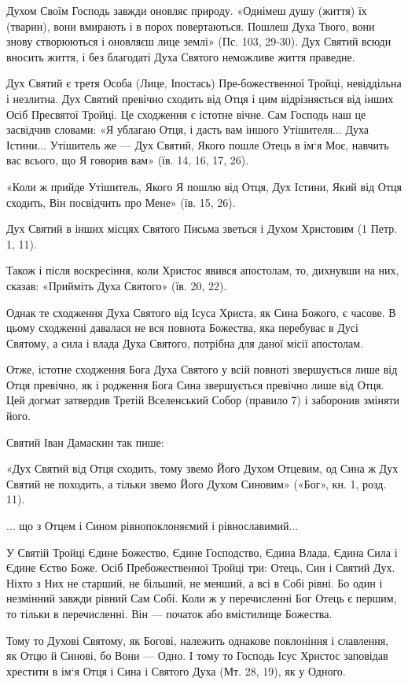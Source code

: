 \documentclass[main.tex]{subfiles}
\begin{document}
Духом Своїм Господь завжди оновляє природу. «Однімеш душу (життя) їх (тварин), вони вмирають і в порох повертаються. Пошлеш Духа Твого, вони знову створюються і оновляєш лице землі» (Пс. 103, 29-30). Дух Святий всюди вносить життя, і без благодаті Духа Святого неможливе життя праведне.
 
Дух Святий є третя Особа (Лице, Іпостась) Пре-божественної Тройці, невіддільна і незлитна. Дух Святий превічно сходить від Отця і цим відрізняється від інших Осіб Пресвятої Тройці. Це сходження є істотне вічне. Сам Господь наш це засвідчив словами: «Я ублагаю Отця, і дасть вам іншого Утішителя... Духа Істини... Утішитель же — Дух Святий, Якого пошле Отець в ім`я Моє, навчить вас всього, що Я говорив вам» (їв. 14, 16, 17, 26).

«Коли ж прийде Утішитель, Якого Я пошлю від Отця, Дух Істини, Який від Отця сходить, Він посвідчить про Мене» (їв. 15, 26).

Дух Святий в інших місцях Святого Письма зветься і Духом Христовим (1 Петр. 1, 11).

Також і після воскресіння, коли Христос явився апостолам, то, дихнувши на них, сказав: «Прийміть Духа Святого» (їв. 20, 22).

Однак те сходження Духа Святого від Ісуса Христа, як Сина Божого, є часове. В цьому сходженні давалася не вся повнота Божества, яка перебуває в Дусі Святому, а сила і влада Духа Святого, потрібна для даної місії апостолам.

Отже, істотне сходження Бога Духа Святого у всій повноті звершується лише від Отця превічно, як і родження Бога Сина звершується превічно лише від Отця. Цей догмат затвердив Третій Вселенський Собор (правило 7) і заборонив зміняти його.

Святий Іван Дамаскин так пише:

«Дух Святий від Отця сходить, тому звемо Його Духом Отцевим, од Сина ж Дух Святий не походить, а тільки звемо Його Духом Синовим» («Бог», кн. 1, розд. 11).

... що з Отцем і Сином рівнопоклоняємий і рівнославимий...

У Святій Тройці Єдине Божество, Єдине Господство, Єдина Влада, Єдина Сила і Єдине Єство Боже. Осіб Пребожественної Тройці три: Отець, Син і Святий Дух. Ніхто з Них не старший, не більший, не менший, а всі в Собі рівні. Бо один і незмінний завжди рівний Сам Собі. Коли ж у перечисленні Бог Отець є першим, то тільки в перечисленні. Він — початок або вмістилище Божества.

Тому то Духові Святому, як Богові, належить однакове поклоніння і славлення, як Отцю й Синові, бо Вони — Одно. І тому то Господь Ісус Христос заповідав хрестити в ім`я Отця і Сина і Святого Духа (Мт. 28, 19), як у Одного.
\end{document}
